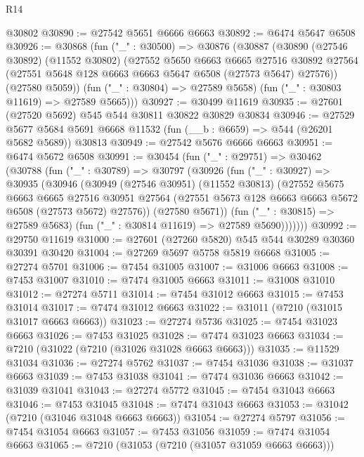 \begin{lexlean}{R14}
\begin{coremodule}
    @30802
@30890 := @27542 @5651 @6666 @6663
@30892 := @6474 @5647 @6508
@30926 := @30868
    (fun ("_" : @30500) =>
    @30876
      (@30887
        (@30890
          (@27546 @30892)
          (@11552 @30802)
          (@27552
            @5650
            @6663
            @6665
            @27516
            @30892
            @27564
            (@27551 @5648 @128 @6663 @6663 @5647 @6508 (@27573 @5647) @27576))
          (@27580 @5059))
        (fun ("_" : @30804) => @27589 @5658)
        (fun ("_" : @30803 @11619) => @27589 @5665)))
@30927 := @30499 @11619
@30935 := @27601 (@27520 @5692) @545 @544 @30811 @30822 @30829 @30834
@30946 := @27529
    @5677
    @5684
    @5691
    @6668
    @11532
    (fun (__b : @6659) => @544 (@26201 @5682 @5689))
    @30813
@30949 := @27542 @5676 @6666 @6663
@30951 := @6474 @5672 @6508
@30991 := @30454
    (fun ("_" : @29751) =>
    @30462
      (@30788
        (fun ("_" : @30789) =>
        @30797
          (@30926
            (fun ("_" : @30927) =>
            @30935
              (@30946
                (@30949
                  (@27546 @30951)
                  (@11552 @30813)
                  (@27552
                    @5675
                    @6663
                    @6665
                    @27516
                    @30951
                    @27564
                    (@27551 @5673 @128 @6663 @6663 @5672 @6508 (@27573 @5672) @27576))
                  (@27580 @5671))
                (fun ("_" : @30815) => @27589 @5683)
                (fun ("_" : @30814 @11619) => @27589 @5690)))))))
@30992 := @29750 @11619
@31000 := @27601 (@27260 @5820) @545 @544 @30289 @30360 @30391 @30420
@31004 := @27269 @5697 @5758 @5819 @6668
@31005 := @27274 @5701
@31006 := @7454 @31005
@31007 := @31006 @6663
@31008 := @7453 @31007
@31010 := @7474 @31005 @6663
@31011 := @31008 @31010
@31012 := @27274 @5711
@31014 := @7454 @31012 @6663
@31015 := @7453 @31014
@31017 := @7474 @31012 @6663
@31022 := @31011 (@7210 (@31015 @31017 @6663 @6663))
@31023 := @27274 @5736
@31025 := @7454 @31023 @6663
@31026 := @7453 @31025
@31028 := @7474 @31023 @6663
@31034 := @7210 (@31022 (@7210 (@31026 @31028 @6663 @6663)))
@31035 := @11529 @31034
@31036 := @27274 @5762
@31037 := @7454 @31036
@31038 := @31037 @6663
@31039 := @7453 @31038
@31041 := @7474 @31036 @6663
@31042 := @31039 @31041
@31043 := @27274 @5772
@31045 := @7454 @31043 @6663
@31046 := @7453 @31045
@31048 := @7474 @31043 @6663
@31053 := @31042 (@7210 (@31046 @31048 @6663 @6663))
@31054 := @27274 @5797
@31056 := @7454 @31054 @6663
@31057 := @7453 @31056
@31059 := @7474 @31054 @6663
@31065 := @7210 (@31053 (@7210 (@31057 @31059 @6663 @6663)))

\end{coremodule}
\end{lexlean}
